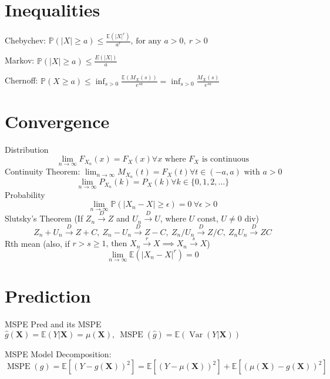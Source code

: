 \documentclass[twocolumn]{amsart}
\newcommand{\E}{\mathbb{E}}
\renewcommand{\P}{\mathbb{P}}
\newcommand{\Var}{\operatorname{Var}}
\newcommand{\MSPE}{\operatorname{MSPE}}
\begin{document}
\section*{Inequalities}
Chebychev: $\P(|X|\geq a) \leq \frac{\E(|X|^r)}{a^r}\text{, for any }a>0,~r>0$

Markov: $\P(|X|\geq a) \leq \frac{E(|X|)}{a}$

Chernoff: $\P(X\geq a)\leq \inf_{s>0}\frac{\E(M_{X}(s))}{e^{sa}}=\inf_{s>0}\frac{M_{X}(s)}{e^{sa}}$

\section*{Convergence}
Distribution
\begin{equation*}
  \lim_{n\to\infty}F_{X_{n}}(x)=F_{X}(x)\forall x \text{ where }F_{X}\text{ is continuous}
\end{equation*}
Continuity Theorem: $\lim_{n\to\infty}M_{X_{n}}(t)=F_{X}(t)\forall t \in (-a,a) \text{ with } a>0$
\begin{equation*}
  \lim_{n\to\infty}P_{X_{n}}(k)=P_{X}(k)\forall k \in \{0, 1, 2, \ldots\}
\end{equation*}
Probability
\begin{equation*}
  \lim_{n\to\infty}\P(|X_n-X|\geq \epsilon) = 0~\forall\epsilon > 0
\end{equation*}
Slutsky's Theorem (If $Z_n\overset{D}{\longrightarrow}Z$ and
$U_n\overset{D}{\longrightarrow}U$, where $U$ const, $U\neq 0$ div)
\begin{equation*}
  Z_n+U_n\overset{D}{\longrightarrow}Z+C,~Z_n-U_n\overset{D}{\longrightarrow}Z-C,~Z_n/U_n\overset{D}{\longrightarrow}Z/C,~Z_{n}U_{n}\overset{D}{\longrightarrow}ZC
\end{equation*}
Rth mean (also, if $r>s\geq 1 \text{, then } X_n\overset{r}{\longrightarrow}
X\implies X_n\overset{s}{\longrightarrow}X$)
\begin{equation*}
  \lim_{n\to\infty}\E(|X_n-X|^r)=0
\end{equation*}

\section*{Prediction}
MSPE Pred and its MSPE $\hat{g}(\boldsymbol{X}) = \E(Y|\boldsymbol{X}) = \mu(\boldsymbol{X}),~\MSPE(\hat{g})=\E(\Var(Y|\boldsymbol{X}))$

MSPE Model Decomposition:
\begin{equation*}
  \MSPE(g) = \E[(Y-g(\boldsymbol{X}))^2] = \E[(Y-\mu(\boldsymbol{X}))^2] + \E[(\mu(\boldsymbol{X})-g(\boldsymbol{X}))^2]
\end{equation*}
\end{document}
